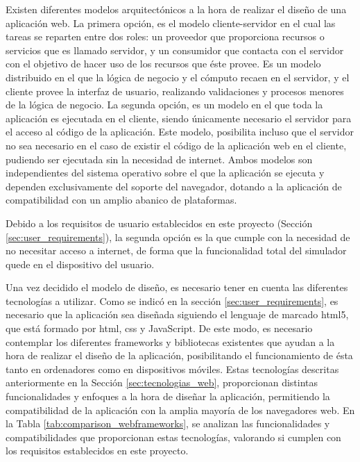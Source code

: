 Existen diferentes modelos arquitectónicos a la hora de realizar el diseño de una aplicación web. La primera opción, es el modelo cliente-servidor en el cual las tareas se reparten entre dos roles: un proveedor que proporciona recursos o servicios que es llamado servidor, y un consumidor que contacta con el servidor con el objetivo de hacer uso de los recursos que éste provee. Es un modelo distribuido en el que la lógica de negocio y el cómputo recaen en el servidor, y el cliente provee la interfaz de usuario, realizando validaciones y procesos menores de la lógica de negocio. La segunda opción, es un modelo en el que toda la aplicación es ejecutada en el cliente, siendo únicamente necesario el servidor para el acceso al código de la aplicación. Este modelo, posibilita incluso que el servidor no sea necesario en el caso de existir el código de la aplicación web en el cliente, pudiendo ser ejecutada sin la necesidad de internet. Ambos modelos son independientes del sistema operativo sobre el que la aplicación  se ejecuta y dependen exclusivamente del soporte del navegador, dotando a la aplicación de compatibilidad con un amplio abanico de plataformas.

Debido a los requisitos de usuario establecidos en este proyecto (Sección \ref{sec:user_requirements}), la segunda opción es la que cumple con la necesidad de no necesitar acceso a internet, de forma que la funcionalidad total del simulador quede en el dispositivo del usuario.

Una vez decidido el modelo de diseño, es necesario tener en cuenta las diferentes tecnologías a utilizar. Como se indicó en la sección \ref{sec:user_requirements}, es necesario que la aplicación sea diseñada siguiendo el lenguaje de marcado \acrshort{html}5, que está formado por \acrshort{html}, \acrshort{css} y JavaScript. De este modo, es necesario contemplar los diferentes frameworks y bibliotecas existentes que ayudan a la hora de realizar el diseño de la aplicación, posibilitando el funcionamiento de ésta tanto en ordenadores como en dispositivos móviles. Estas tecnologías descritas anteriormente en la Sección \ref{sec:tecnologias_web}, proporcionan distintas funcionalidades y enfoques a la hora de diseñar la aplicación, permitiendo la compatibilidad de la aplicación con la amplia mayoría de los navegadores web. En la Tabla \ref{tab:comparison_webframeworks}, se analizan las funcionalidades y compatibilidades que proporcionan estas tecnologías, valorando si cumplen con los requisitos establecidos en este proyecto.

